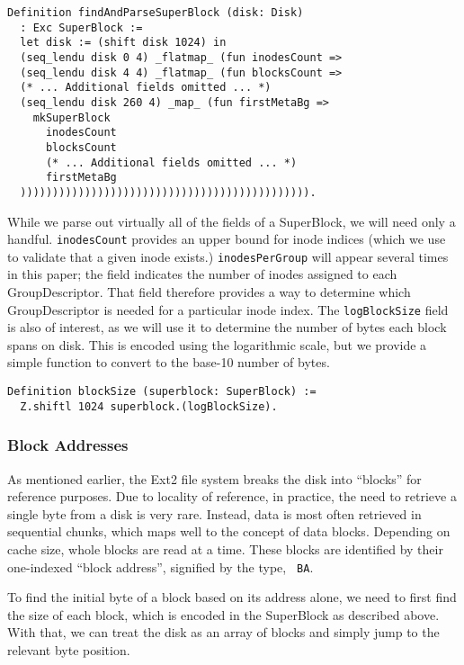 \documentclass[nocopyrightspace]{sigplanconf}
\begin{document}
\begin{lstlisting}
Definition findAndParseSuperBlock (disk: Disk)
  : Exc SuperBlock :=
  let disk := (shift disk 1024) in
  (seq_lendu disk 0 4) _flatmap_ (fun inodesCount =>
  (seq_lendu disk 4 4) _flatmap_ (fun blocksCount =>
  (* ... Additional fields omitted ... *)
  (seq_lendu disk 260 4) _map_ (fun firstMetaBg =>
    mkSuperBlock
      inodesCount
      blocksCount
      (* ... Additional fields omitted ... *)
      firstMetaBg
  ))))))))))))))))))))))))))))))))))))))))))))).
\end{lstlisting}

While we parse out virtually all of the fields of a SuperBlock, we will need
only a handful. {\tt inodesCount} provides an upper bound for inode indices
(which we use to validate that a given inode exists.) {\tt inodesPerGroup}
will appear several times in this paper; the field indicates the number of
inodes assigned to each GroupDescriptor. That field therefore provides a way
to determine which GroupDescriptor is needed for a particular inode index. The
{\tt logBlockSize} field is also of interest, as we will use it to determine
the number of bytes each block spans on disk. This is encoded using the
logarithmic scale, but we provide a simple function to convert to the base-10
number of bytes.

\begin{lstlisting}
Definition blockSize (superblock: SuperBlock) := 
  Z.shiftl 1024 superblock.(logBlockSize).
\end{lstlisting}

\subsubsection{Block Addresses}

As mentioned earlier, the Ext2 file system breaks the disk into ``blocks'' for
reference purposes. Due to locality of reference, in practice, the need to
retrieve a single byte from a disk is very rare. Instead, data is most often
retrieved in sequential chunks, which maps well to the concept of data blocks.
Depending on cache size, whole blocks are read at a time. These blocks are
identified by their one-indexed ``block address'', signified by the type, {\tt
BA}. 

To find the initial byte of a block based on its address alone, we need to
first find the size of each block, which is encoded in the SuperBlock as
described above. With that, we can treat the disk as an array of blocks and
simply jump to the relevant byte position.
\end{document}
